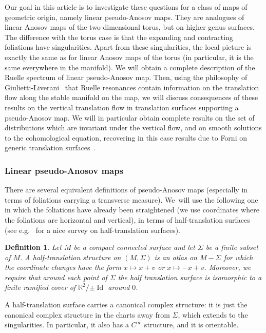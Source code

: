 \documentclass[10pt]{amsart}
\newcommand{\R}{\mathbb{R}}
\DeclareMathOperator{\Id}{Id}
\newtheorem{definition}[thm]{Definition}
\theoremstyle{definition}
\numberwithin{equation}{section}
\begin{document}
Our goal in this article is to investigate these questions for a class of
maps of geometric origin, namely linear pseudo-Anosov maps. They are analogues of
linear Anosov maps of the two-dimensional torus, but on higher genus
surfaces. The difference with the torus case is that the expanding and
contracting foliations have singularities. Apart from these singularities,
the local picture is exactly the same as for linear Anosov maps of the torus
(in particular, it is the same everywhere in the manifold). We will obtain a
complete description of the Ruelle spectrum of linear pseudo-Anosov map.
Then, using the philosophy of Giulietti-Liverani~\cite{giulietti_liverani}
that Ruelle resonances contain information on the translation flow along the
stable manifold on the map, we will discuss consequences of these results on
the vertical translation flow in translation surfaces supporting a
pseudo-Anosov map. We will in particular obtain complete results on the set
of distributions which are invariant under the vertical flow, and on smooth
solutions to the cohomological equation, recovering in this case results due
to Forni on generic translation surfaces~\cite{forni_cohomological,
forni_deviation, forni_regularity}.

\subsubsection*{Linear pseudo-Anosov maps}
There are several equivalent definitions of pseudo-Anosov maps (especially in
terms of foliations carrying a transverse measure). We~will use the following
one in which the foliations have already been straightened (\ie we use
coordinates where the foliations are horizontal and vertical), in terms of
half-translation surfaces (see e.g.~\cite{zorich} for a nice survey on half-translation surfaces).

\begin{definition}
\label{def:half_translation} Let $M$ be a compact connected surface and let
$\Sigma$ be a finite subset of $M$. A half-translation structure on
$(M,\Sigma)$ is an atlas on $M-\Sigma$ for which the coordinate changes have
the form $x \mapsto x+v$ or $x \mapsto -x+v$. Moreover, we require that
around each point of $\Sigma$ the half translation surface is isomorphic to a
finite ramified cover of $\R^2/{\pm \Id}$ around $0$.
\end{definition}
A half-translation surface carries a canonical complex structure: it is just
the canonical complex structure in the charts away from $\Sigma$, which
extends to the singularities. In particular, it also has a $C^\infty$
structure, and it is orientable.
\end{document}
